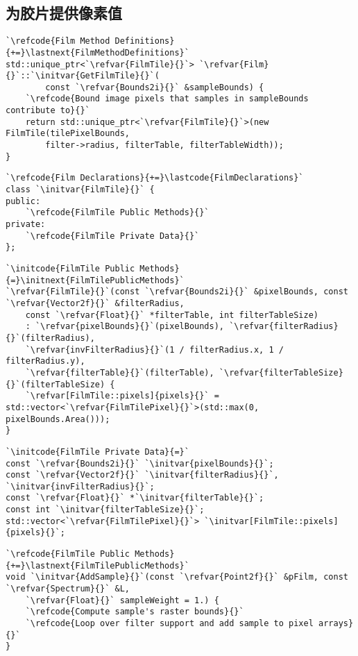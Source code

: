 \subsection{为胶片提供像素值}\label{sub:为胶片提供像素值}
\begin{lstlisting}
`\refcode{Film Method Definitions}{+=}\lastnext{FilmMethodDefinitions}`
std::unique_ptr<`\refvar{FilmTile}{}`> `\refvar{Film}{}`::`\initvar{GetFilmTile}{}`(
        const `\refvar{Bounds2i}{}` &sampleBounds) {
    `\refcode{Bound image pixels that samples in sampleBounds contribute to}{}`
    return std::unique_ptr<`\refvar{FilmTile}{}`>(new FilmTile(tilePixelBounds,
        filter->radius, filterTable, filterTableWidth));
}
\end{lstlisting}

\begin{lstlisting}
`\refcode{Film Declarations}{+=}\lastcode{FilmDeclarations}`
class `\initvar{FilmTile}{}` {
public:
    `\refcode{FilmTile Public Methods}{}`
private:
    `\refcode{FilmTile Private Data}{}`
};
\end{lstlisting}

\begin{lstlisting}
`\initcode{FilmTile Public Methods}{=}\initnext{FilmTilePublicMethods}`
`\refvar{FilmTile}{}`(const `\refvar{Bounds2i}{}` &pixelBounds, const `\refvar{Vector2f}{}` &filterRadius,
    const `\refvar{Float}{}` *filterTable, int filterTableSize)
    : `\refvar{pixelBounds}{}`(pixelBounds), `\refvar{filterRadius}{}`(filterRadius),
    `\refvar{invFilterRadius}{}`(1 / filterRadius.x, 1 / filterRadius.y),
    `\refvar{filterTable}{}`(filterTable), `\refvar{filterTableSize}{}`(filterTableSize) {
    `\refvar[FilmTile::pixels]{pixels}{}` = std::vector<`\refvar{FilmTilePixel}{}`>(std::max(0, pixelBounds.Area()));
}
\end{lstlisting}

\begin{lstlisting}
`\initcode{FilmTile Private Data}{=}`
const `\refvar{Bounds2i}{}` `\initvar{pixelBounds}{}`;
const `\refvar{Vector2f}{}` `\initvar{filterRadius}{}`, `\initvar{invFilterRadius}{}`;
const `\refvar{Float}{}` *`\initvar{filterTable}{}`;
const int `\initvar{filterTableSize}{}`;
std::vector<`\refvar{FilmTilePixel}{}`> `\initvar[FilmTile::pixels]{pixels}{}`;
\end{lstlisting}

\begin{lstlisting}
`\refcode{FilmTile Public Methods}{+=}\lastnext{FilmTilePublicMethods}`
void `\initvar{AddSample}{}`(const `\refvar{Point2f}{}` &pFilm, const `\refvar{Spectrum}{}` &L,
    `\refvar{Float}{}` sampleWeight = 1.) {
    `\refcode{Compute sample's raster bounds}{}`
    `\refcode{Loop over filter support and add sample to pixel arrays}{}`
}
\end{lstlisting}

